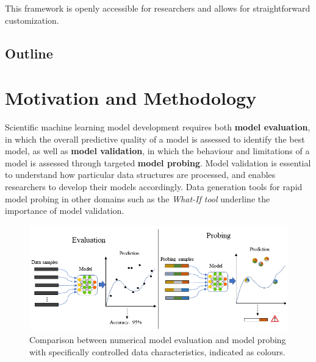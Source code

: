 \documentclass[runningheads]{llncs}
\begin{document}
This framework is openly accessible for researchers and allows for straightforward customization.


\subsection{Outline}


\section{Motivation and Methodology}\label{Sec:Motivation}


Scientific machine learning model development requires both \textbf{model evaluation}, in which the overall predictive quality of a model is assessed to identify the best model, as well as \textbf{model validation}, in which the behaviour and limitations of a model is assessed through targeted \textbf{model probing}. Model validation is essential to understand how particular data structures are processed, and enables researchers to develop their models accordingly. Data generation tools for rapid model probing in other domains such as the \textit{What-If tool} \cite{wexler2019if} underline the importance of model validation.


\begin{figure}
\centering
\includegraphics[width=\textwidth]{images/Eva_Prob.png}
\caption{Comparison between numerical model evaluation and model probing with specifically controlled data characteristics, indicated as colours.}
\end{figure}
\end{document}
